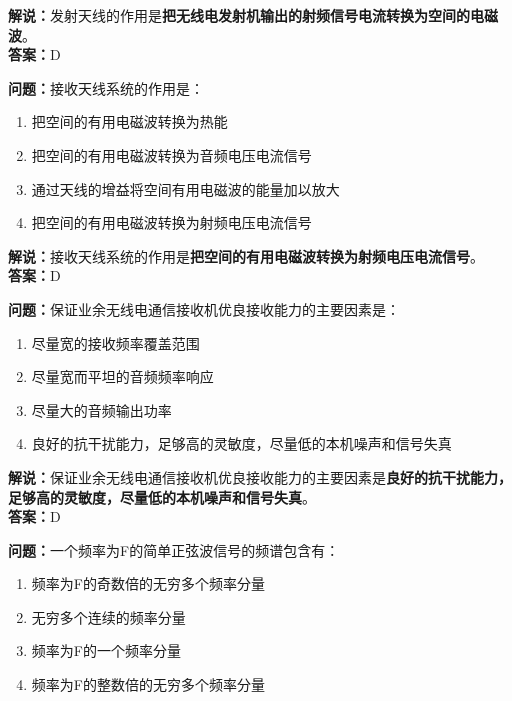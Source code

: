 \documentclass{ctexbook}
\begin{document}
\noindent\textbf{解说：}发射天线的作用是\textbf{把无线电发射机输出的射频信号电流转换为空间的电磁波}。\\\noindent\textbf{答案：}D%


\bigskip


\noindent\textbf{问题：}接收天线系统的作用是：

\begin{enumerate}[label=\Alph*), leftmargin=3em]
	\item 把空间的有用电磁波转换为热能
	\item 把空间的有用电磁波转换为音频电压电流信号
	\item 通过天线的增益将空间有用电磁波的能量加以放大
	\item 把空间的有用电磁波转换为射频电压电流信号
\end{enumerate}

\noindent\textbf{解说：}接收天线系统的作用是\textbf{把空间的有用电磁波转换为射频电压电流信号}。\\\noindent\textbf{答案：}D%


\bigskip


\noindent\textbf{问题：}保证业余无线电通信接收机优良接收能力的主要因素是：

\begin{enumerate}[label=\Alph*), leftmargin=3em]
	\item 尽量宽的接收频率覆盖范围
	\item 尽量宽而平坦的音频频率响应
	\item 尽量大的音频输出功率
	\item 良好的抗干扰能力，足够高的灵敏度，尽量低的本机噪声和信号失真
\end{enumerate}

\noindent\textbf{解说：}保证业余无线电通信接收机优良接收能力的主要因素是\textbf{良好的抗干扰能力，足够高的灵敏度，尽量低的本机噪声和信号失真}。\\\noindent\textbf{答案：}D%


\bigskip


\noindent\textbf{问题：}一个频率为F的简单正弦波信号的频谱包含有：

\begin{enumerate}[label=\Alph*), leftmargin=3em]
	\item 频率为F的奇数倍的无穷多个频率分量
	\item 无穷多个连续的频率分量
	\item 频率为F的一个频率分量
	\item 频率为F的整数倍的无穷多个频率分量
\end{enumerate}
\end{document}
